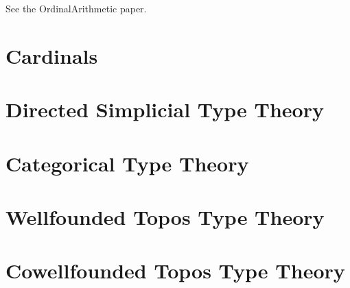 \documentclass[a4paper,openany]{amsbook}
\begin{document}
See the OrdinalArithmetic paper.

\chapter{Cardinals}

\chapter{Directed Simplicial Type Theory}

\chapter{Categorical Type Theory}

\chapter{Wellfounded Topos Type Theory}

\chapter{Cowellfounded Topos Type Theory}



\end{document}
